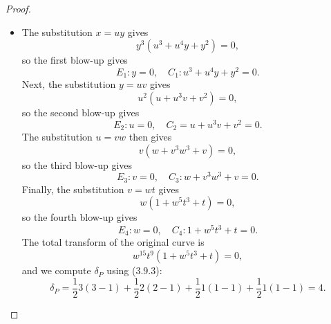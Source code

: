\documentclass[a4paper]{article}
\begin{document}
\begin{enumerate} [label=\textbf{\arabic*.}, leftmargin=0em]
\begin{proof}
\begin{itemize} [leftmargin=0cm]
                  \item[(b)] The substitution $x = uy$ gives
                        \begin{equation*}
                            y^3(u^3 + u^4 y + y^2) = 0,
                        \end{equation*}
                        so the first blow-up gives
                        \begin{equation*}
                            E_1 : y = 0, \quad C_1 : u^3 + u^4 y + y^2 = 0.
                        \end{equation*}
                        Next, the substitution $y = uv$ gives
                        \begin{equation*}
                            u^2(u + u^3 v + v^2) = 0,
                        \end{equation*}
                        so the second blow-up gives
                        \begin{equation*}
                            E_2 : u = 0, \quad C_2 = u + u^3 v + v^2 = 0.
                        \end{equation*}
                        The substitution $u = vw$ then gives
                        \begin{equation*}
                            v(w + v^3w^3 + v) = 0,
                        \end{equation*}
                        so the third blow-up gives
                        \begin{equation*}
                            E_3 : v = 0, \quad C_3 : w + v^3 w^3 + v = 0.
                        \end{equation*}
                        Finally, the substitution $v = wt$ gives
                        \begin{equation*}
                            w(1 + w^5t^3 + t) = 0,
                        \end{equation*}
                        so the fourth blow-up gives
                        \begin{equation*}
                            E_4 : w = 0, \quad C_4 : 1 + w^5 t^3 + t = 0.
                        \end{equation*}
                        The total transform of the original curve is
                        \begin{equation*}
                            w^{15}t^9(1 + w^5 t^3 + t) = 0,
                        \end{equation*}
                        and we compute $\delta_P$ using (3.9.3):
                        \begin{equation*}
                            \delta_P = \frac{1}{2}3(3 - 1) + \frac{1}{2}2(2 - 1) + \frac{1}{2}1(1 - 1) + \frac{1}{2}1(1 - 1) = 4.
                        \end{equation*}


\end{itemize}
\end{proof}
\end{enumerate}
\end{document}
